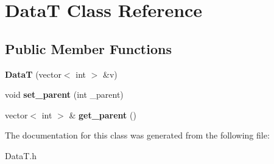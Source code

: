 \hypertarget{class_data_t}{}\section{DataT Class Reference}
\label{class_data_t}
\subsection*{Public Member Functions}
\begin{DoxyCompactItemize}
\item 
\mbox{\label{class_data_t_a818050013ebb093123b48825d705b7c1}} 
{\bfseries DataT} (vector$<$ int $>$ \&v)
\item 
\mbox{\label{class_data_t_ad68e384679db205ace0b204bd8dbd6a7}} 
void {\bfseries set\+\_\+parent} (int \+\_\+parent)
\item 
\mbox{\label{class_data_t_af4f1ff8717d0839ac925d0799f4f7f76}} 
vector$<$ int $>$ \& {\bfseries get\+\_\+parent} ()
\end{DoxyCompactItemize}


The documentation for this class was generated from the following file\+:\begin{DoxyCompactItemize}
\item 
Data\+T.\+h\end{DoxyCompactItemize}
